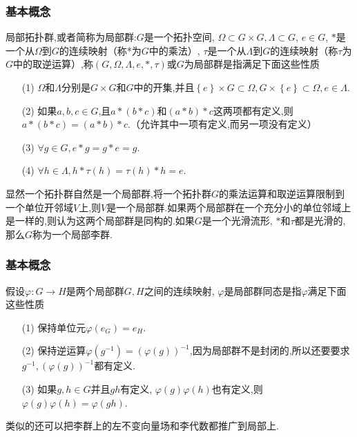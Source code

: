 \documentclass[aspectratio=169, 10pt, utf8, mathserif]{beamer}
\begin{document}
\begin{frame}[plain]
	\frametitle{基本概念}
	\begin{Definition}
		局部拓扑群,或者简称为局部群:$G$是一个拓扑空间, $\Omega\subset G\times G,\Lambda\subset G$, $e\in G$, $*$是一个从$\Omega$到$G$的连续映射（称*为$G$中的乘法）, $\tau$是一个从$\Lambda$到$G$的连续映射（称$\tau$为$G$中的取逆运算）,称$(G,\Omega,\Lambda,e,*,\tau)$或$G$为局部群是指满足下面这些性质
		\begin{enumerate}
			\item[\textnormal{(1)}]$\Omega$和$\Lambda$分别是$G\times G$和$G$中的开集,并且$\left\{e\right\}\times G \subset \Omega,G\times \left\{e\right\} \subset \Omega,e\in \Lambda$.
			\item[\textnormal{(2)}]如果$a,b,c\in G$,且$a*(b*c)$和$(a*b)*c$这两项都有定义,则$a*(b*c)=(a*b)*c$.（允许其中一项有定义,而另一项没有定义）
			\item[\textnormal{(3)}]$\forall g\in G,e*g=g*e=g$.
			\item[\textnormal{(4)}]$\forall h\in \Lambda,h*\tau(h)=\tau(h)*h=e$.
		\end{enumerate}
	\end{Definition}
	显然一个拓扑群自然是一个局部群,将一个拓扑群$G$的乘法运算和取逆运算限制到一个单位开邻域$V$上,则$V$是一个局部群.如果两个局部群在一个充分小的单位邻域上是一样的,则认为这两个局部群是同构的.如果$G$是一个光滑流形, $*$和$\tau$都是光滑的,那么$G$称为一个局部李群.
\end{frame}

\begin{frame}[plain]
	\frametitle{基本概念}
	\begin{Definition}
		假设$\varphi:G\to H$是两个局部群$G,H$之间的连续映射, $\varphi$是局部群同态是指$\varphi$满足下面这些性质
		\begin{enumerate}
			\item[\textnormal{(1)}]保持单位元$\varphi(e_G)=e_H$.
			\item[\textnormal{(2)}]保持逆运算$\varphi(g^{-1})=(\varphi(g))^{-1}$,因为局部群不是封闭的,所以还要要求$g^{-1},(\varphi(g))^{-1}$都有定义.
			\item[\textnormal{(3)}]如果$g,h\in G$并且$gh$有定义, $\varphi(g)\varphi(h)$也有定义,则$\varphi(g)\varphi(h)=\varphi(gh)$.
		\end{enumerate}
	\end{Definition}

	类似的还可以把李群上的左不变向量场和李代数都推广到局部上.
\end{frame}
\end{document}
